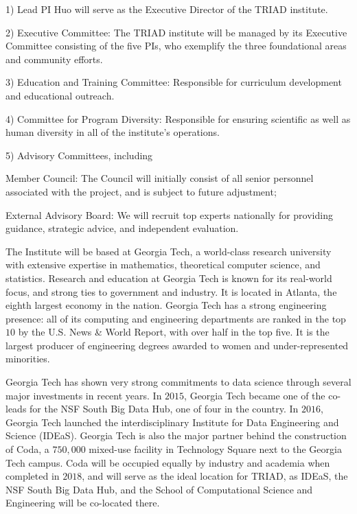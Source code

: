 \documentclass[12pt]{article}
\newenvironment{packed_item}{
\begin{itemize}
  \setlength{\itemindent}{-0em}
  \setlength{\itemsep}{-0em}
  \setlength{\parskip}{-0em}
  \setlength{\parsep}{-0em}
}{\end{itemize}}
\begin{document}
1) Lead PI Huo will serve as the Executive Director of the TRIAD institute.

2) Executive Committee: The TRIAD institute will be managed by its Executive Committee consisting of the five PIs, who exemplify the three foundational areas and community efforts.

3) Education and Training Committee: Responsible for curriculum development and educational outreach.

4) Committee for Program Diversity: Responsible for ensuring scientific as well as human diversity in all of the institute's operations.

5) Advisory Committees, including
\noindent \vspace*{-0.5em}
\begin{packed_item}
\item Member Council: The Council will initially consist of all senior personnel associated with the project, and is subject to future adjustment;

\item External Advisory Board: We will recruit top experts nationally for providing guidance, strategic advice, and independent evaluation.
\end{packed_item}

The Institute will be based at Georgia Tech, a world-class research university with extensive expertise in mathematics, theoretical computer science, and statistics.
Research and education at Georgia Tech is known for its real-world focus, and strong ties to government and industry.
It is located in Atlanta, the eighth largest economy in the nation.
Georgia Tech has a strong engineering presence: all of its computing and engineering departments are ranked in the top $10$ by the U.S. News \& World Report, with over half in the top five.
It is the largest producer of engineering degrees awarded to women and under-represented minorities.

Georgia Tech has shown very strong commitments to data science through several major investments in recent years.
In $2015$, Georgia Tech became one of the co-leads for the NSF South Big Data Hub, one of four in the country.
In $2016$, Georgia Tech launched the interdisciplinary Institute for Data Engineering and Science (IDEaS).
Georgia Tech is also the major partner behind the construction of Coda, a $750,000$ mixed-use facility in Technology Square next to the Georgia Tech campus.
Coda will be occupied equally by industry and academia when completed in $2018$, and will serve as the ideal location for TRIAD, as IDEaS, the NSF South Big Data Hub, and the School of Computational Science and Engineering will be co-located there.
\end{document}
